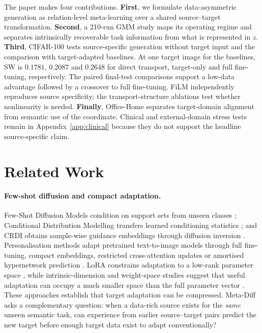 \documentclass{article}
\begin{document}
The paper makes four contributions. \textbf{First}, we formulate data-asymmetric generation as relation-level meta-learning over a shared source--target transformation. \textbf{Second}, a 210-run GMM study maps its operating regime and separates intrinsically recoverable task information from what is represented in $z$. \textbf{Third}, CIFAR-100 tests source-specific generation without target input and the comparison with target-adapted baselines. At one target image for the baselines, SW is $0.1781$, $0.2087$ and $0.2648$ for direct transport, target-only and full fine-tuning, respectively. The paired final-test comparisons support a low-data advantage followed by a crossover to full fine-tuning. FiLM independently reproduces source specificity; the transport-structure ablations test whether nonlinearity is needed. \textbf{Finally}, Office-Home separates target-domain alignment from semantic use of the coordinate. Clinical and external-domain stress tests remain in Appendix~\ref{app:clinical} because they do not support the headline source-specific claim.

\section{Related Work}
\paragraph{Few-shot diffusion and compact adaptation.}
Few-Shot Diffusion Models condition on support sets from unseen classes \citep{giannone2022fsdm}; Conditional Distribution Modelling transfers learned conditioning statistics \citep{gupta2024cdm}; and CRDI obtains sample-wise guidance embeddings through diffusion inversion \citep{cao2024crdi}. Personalisation methods adapt pretrained text-to-image models through full fine-tuning, compact embeddings, restricted cross-attention updates or amortised hypernetwork prediction \citep{ruiz2023dreambooth,gal2023textualinversion,kumari2023customdiffusion,ruiz2024hyperdreambooth}. LoRA constrains adaptation to a low-rank parameter space \citep{hu2022lora}, while intrinsic-dimension and weight-space studies suggest that useful adaptation can occupy a much smaller space than the full parameter vector \citep{aghajanyan2021intrinsic,dravid2024weights2weights}. These approaches establish that target adaptation can be compressed. Meta-Diff asks a complementary question: when a data-rich source exists for the \emph{same} unseen semantic task, can experience from earlier source--target pairs predict the new target before enough target data exist to adapt conventionally?
\end{document}
